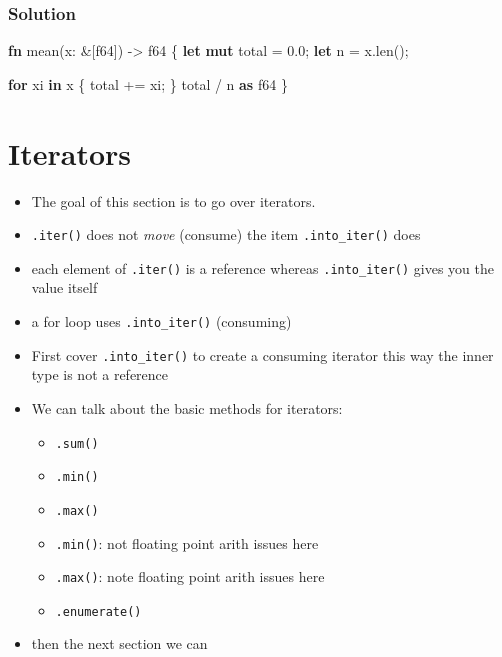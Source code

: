 \documentclass[
  letterpaper,
  DIV=11,
  numbers=noendperiod,
  oneside]{scrreprt}
\newenvironment{Shaded}{\begin{snugshade}}{\end{snugshade}}
\newcommand{\ControlFlowTok}[1]{\textcolor[rgb]{0.00,0.23,0.31}{\textbf{#1}}}
\newcommand{\DataTypeTok}[1]{\textcolor[rgb]{0.68,0.00,0.00}{#1}}
\newcommand{\DecValTok}[1]{\textcolor[rgb]{0.68,0.00,0.00}{#1}}
\newcommand{\KeywordTok}[1]{\textcolor[rgb]{0.00,0.23,0.31}{\textbf{#1}}}
\newcommand{\NormalTok}[1]{\textcolor[rgb]{0.00,0.23,0.31}{#1}}
\newcommand{\OperatorTok}[1]{\textcolor[rgb]{0.37,0.37,0.37}{#1}}
\providecommand{\tightlist}{%
  \setlength{\itemsep}{0pt}\setlength{\parskip}{0pt}}\usepackage{longtable,booktabs,array}
\begin{document}
\subsection{Solution}\label{solution-8}

\begin{Shaded}
\begin{Highlighting}[]
\KeywordTok{fn}\NormalTok{ mean(x}\OperatorTok{:} \OperatorTok{\&}\NormalTok{[}\DataTypeTok{f64}\NormalTok{]) }\OperatorTok{{-}\textgreater{}} \DataTypeTok{f64} \OperatorTok{\{}
    \KeywordTok{let} \KeywordTok{mut}\NormalTok{ total }\OperatorTok{=} \DecValTok{0.0}\OperatorTok{;}
    \KeywordTok{let}\NormalTok{ n }\OperatorTok{=}\NormalTok{ x}\OperatorTok{.}\NormalTok{len()}\OperatorTok{;}

    \ControlFlowTok{for}\NormalTok{ xi }\KeywordTok{in}\NormalTok{ x }\OperatorTok{\{}
\NormalTok{        total }\OperatorTok{+=}\NormalTok{ xi}\OperatorTok{;}
    \OperatorTok{\}}
\NormalTok{    total }\OperatorTok{/}\NormalTok{ n }\KeywordTok{as} \DataTypeTok{f64}
\OperatorTok{\}}
\end{Highlighting}
\end{Shaded}

\chapter{Iterators}\label{iterators}

\begin{itemize}
\item
  The goal of this section is to go over iterators.
\item
  \texttt{.iter()} does not \emph{move} (consume) the item
  \texttt{.into\_iter()} does
\item
  each element of \texttt{.iter()} is a reference whereas
  \texttt{.into\_iter()} gives you the value itself
\item
  a for loop uses \texttt{.into\_iter()} (consuming)
\item
  First cover \texttt{.into\_iter()} to create a consuming iterator this
  way the inner type is not a reference
\item
  We can talk about the basic methods for iterators:

  \begin{itemize}
  \tightlist
  \item
    \texttt{.sum()}
  \item
    \texttt{.min()}
  \item
    \texttt{.max()}
  \item
    \texttt{.min()}: not floating point arith issues here
  \item
    \texttt{.max()}: note floating point arith issues here
  \item
    \texttt{.enumerate()}
  \end{itemize}
\item
  then the next section we can
\end{itemize}
\end{document}
